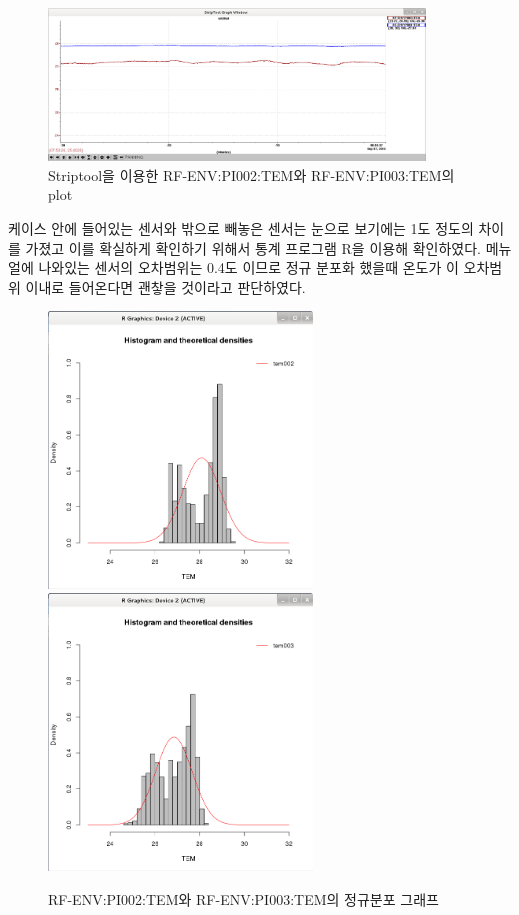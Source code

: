 \documentclass[11pt
  , a4paper
  , article
  , oneside
]{memoir}
\begin{document}
\begin{figure}[h]
	\includegraphics[width=10cm]{./images/65.png}
	\caption{Striptool을 이용한 RF-ENV:PI002:TEM와 RF-ENV:PI003:TEM의 plot}
\end{figure}

케이스 안에 들어있는 센서와 밖으로 빼놓은 센서는 눈으로 보기에는 1도 정도의 차이를 가졌고 이를 확실하게 확인하기 위해서 통계 프로그램 R을 이용해 확인하였다. 메뉴얼에 나와있는 센서의 오차범위는 0.4도 이므로 정규 분포화 했을때 온도가 이 오차범위 이내로 들어온다면 괜챃을 것이라고 판단하였다.
\begin{center}
	\begin{figure}[h]
		\includegraphics[width=7cm]{./images/R1.png}
		\includegraphics[width=7cm]{./images/R2.png}
		\caption{RF-ENV:PI002:TEM와 RF-ENV:PI003:TEM의 정규분포 그래프}
	\end{figure}
\end{center}
\end{document}
